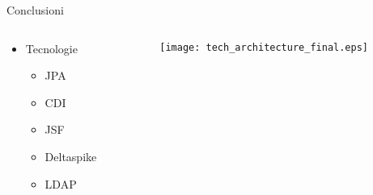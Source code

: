 \begin{frame}{Conclusioni}
\begin{columns}[T]
\begin{column}{.3\textwidth}
\begin{itemize}
\item Tecnologie
\vspace{0.8em}
	\begin{itemize}
	\item JPA
	\vspace{0.6em}
	\item CDI
	\vspace{0.6em}
	\item JSF
	\vspace{0.6em}
	\item Deltaspike
	\vspace{0.6em}
	\item LDAP
\end{itemize}
\end{itemize}
\end{column}

\begin{column}{.55\textwidth}

\centering
\texttt{[image: tech\_architecture\_final.eps]}

\end{column}
\end{columns}

\end{frame}